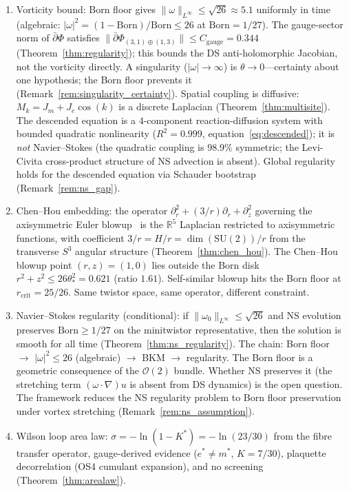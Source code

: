 \documentclass[11pt,a4paper]{article}
\theoremstyle{definition}
\theoremstyle{remark}
\newcommand{\R}{\mathbb{R}}
\newcommand{\dbar}{\bar{\partial}}
\newcommand{\SU}{\mathrm{SU}}
\begin{document}
\begin{enumerate}[nosep]
\item Vorticity bound: Born floor gives $\|\omega\|_{L^\infty}\leq\sqrt{26}\approx 5.1$ uniformly in time (algebraic: $|\omega|^2=(1-\mathrm{Born})/\mathrm{Born}\leq 26$ at $\mathrm{Born}=1/27$). The gauge-sector norm of $\dbar\Phi$ satisfies $\|\dbar\Phi_{(3,1)\oplus(1,3)}\|\leq C_{\mathrm{gauge}}=0.344$ (Theorem~\ref{thm:regularity}); this bounds the DS anti-holomorphic Jacobian, not the vorticity directly. A singularity ($|\omega|\to\infty$) is $\theta\to 0$---certainty about one hypothesis; the Born floor prevents it (Remark~\ref{rem:singularity_certainty}). Spatial coupling is diffusive: $M_k=J_m+J_e\cos(k)$ is a discrete Laplacian (Theorem~\ref{thm:multisite}). The descended equation is a $4$-component reaction-diffusion system with bounded quadratic nonlinearity ($R^2=0.999$, equation~\ref{eq:descended}); it is \emph{not} Navier--Stokes (the quadratic coupling is $98.9\%$ symmetric; the Levi-Civita cross-product structure of NS advection is absent). Global regularity holds for the descended equation via Schauder bootstrap (Remark~\ref{rem:ns_gap}).
\item Chen--Hou embedding: the operator $\partial_r^2+(3/r)\partial_r+\partial_z^2$ governing the axisymmetric Euler blowup~\cite{ChenHou2025} is the $\R^5$ Laplacian restricted to axisymmetric functions, with coefficient $3/r=H/r=\dim(\SU(2))/r$ from the transverse $S^3$ angular structure (Theorem~\ref{thm:chen_hou}). The Chen--Hou blowup point $(r,z)=(1,0)$ lies outside the Born disk $r^2+z^2\leq 26\theta_*^2=0.621$ (ratio $1.61$). Self-similar blowup hits the Born floor at $r_{\mathrm{crit}}=25/26$. Same twistor space, same operator, different constraint.
\item Navier--Stokes regularity (conditional): if $\|\omega_0\|_{L^\infty}\leq\sqrt{26}$ and NS evolution preserves $\mathrm{Born}\geq 1/27$ on the minitwistor representative, then the solution is smooth for all time (Theorem~\ref{thm:ns_regularity}). The chain: Born floor $\to$ $|\omega|^2\leq 26$ (algebraic) $\to$ BKM $\to$ regularity. The Born floor is a geometric consequence of the $\mathcal{O}(2)$ bundle. Whether NS preserves it (the stretching term $(\omega\cdot\nabla)u$ is absent from DS dynamics) is the open question. The framework reduces the NS regularity problem to Born floor preservation under vortex stretching (Remark~\ref{rem:ns_assumption}).
\item Wilson loop area law: $\sigma=-\ln(1-K^*)=-\ln(23/30)$ from the fibre transfer operator, gauge-derived evidence ($e^*\neq m^*$, $K=7/30$), plaquette decorrelation (OS4 cumulant expansion), and no screening (Theorem~\ref{thm:arealaw}).
\end{enumerate}
\end{document}

